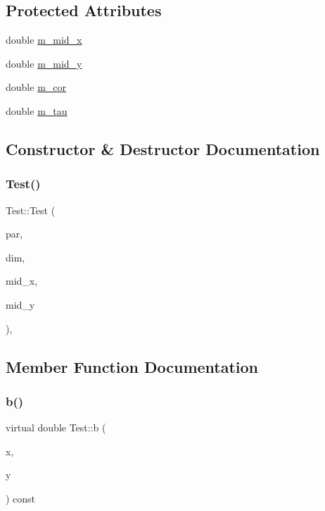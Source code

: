 \subsection*{Protected Attributes}
\begin{DoxyCompactItemize}
\item 
double \hyperlink{classTest_aa0140a23f98929962123d85af64344e8}{m\+\_\+mid\+\_\+x}
\item 
double \hyperlink{classTest_ac5320245177183e915499a6fa24fa78f}{m\+\_\+mid\+\_\+y}
\item 
double \hyperlink{classTest_a11d3ba96c9d5a13c3fb556fa7572b763}{m\+\_\+cor}
\item 
double \hyperlink{classTest_a4188a6948254ce4b0fb56707b8e5e928}{m\+\_\+tau}
\end{DoxyCompactItemize}


\subsection{Constructor \& Destructor Documentation}
\mbox{\label{classTest_a1c7a5a927ffee04c0061ffb70ac33119}} 
\subsubsection{\texorpdfstring{Test()}{Test()}}
{\footnotesize\ttfamily Test\+::\+Test (\begin{DoxyParamCaption}\item[{const \hyperlink{structParser}{Parser} \&}]{par,  }\item[{const \hyperlink{structDimensionManager}{Dimension\+Manager} \&}]{dim,  }\item[{double}]{mid\+\_\+x,  }\item[{double}]{mid\+\_\+y }\end{DoxyParamCaption})\hspace{0.3cm}{\ttfamily [inline]}, {\ttfamily [protected]}}



\subsection{Member Function Documentation}
\mbox{\label{classTest_a7bddd128de5558db4bae9a7542c8ae81}} 
\subsubsection{\texorpdfstring{b()}{b()}}
{\footnotesize\ttfamily virtual double Test\+::b (\begin{DoxyParamCaption}\item[{double}]{x,  }\item[{double}]{y }\end{DoxyParamCaption}) const\hspace{0.3cm}{\ttfamily [pure virtual]}}



